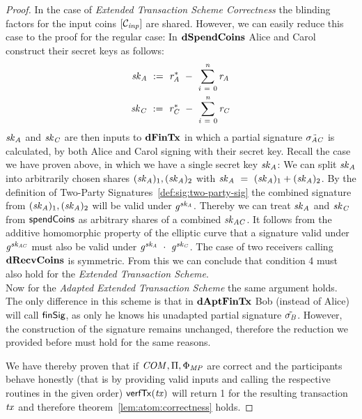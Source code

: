 \begin{proof}
    In the case of \emph{Extended Transaction Scheme Correctness} the blinding factors for the input coins $[\mathcal{C}_{\mathit{inp}}]$ are shared.
    However, we can easily reduce this case to the proof for the regular case:
    In $\mathbf{dSpendCoins}$ Alice and Carol construct their secret keys as follows:
    \begin{gather}
        \mathit{sk}_{\mathit{A}} ~:=~ \mathit{r}_{\mathit{A}}^* ~-~ \sum_{\mathit{i} ~=~ 0}^{\mathit{n}} \mathit{r}_{\mathit{A}} \\
        \mathit{sk}_{\mathit{C}} ~:=~ \mathit{r}_{\mathit{C}}^* ~-~ \sum_{\mathit{i} ~=~ 0}^{\mathit{n}} \mathit{r}_{\mathit{C}}
    \end{gather}
    $\mathit{sk}_{\mathit{A}}$ and $\mathit{sk}_{\mathit{C}}$ are then inputs to $\mathbf{dFinTx}$ in which a partial signature $\tilde{\sigma_{\mathit{A}\mathit{C}}}$ is calculated, by both Alice and Carol signing with their secret key.
    Recall the case we have proven above, in which we have a single secret key $\mathit{sk}_{\mathit{A}}$:
    We can split $\mathit{sk}_{\mathit{A}}$ into arbitrarily chosen shares $(\mathit{sk}_{\mathit{A}})_1, (\mathit{sk}_{\mathit{A}})_2$ with $\mathit{sk}_{\mathit{A}} ~=~ (\mathit{sk}_{\mathit{A}})_1 + (\mathit{sk}_{\mathit{A}})_2$.
    By the definition of Two-Party Signatures~\ref{def:sig:two-party-sig} the combined signature from $(\mathit{sk}_{\mathit{A}})_1, (\mathit{sk}_{\mathit{A}})_2$ will be valid under $\mathit{g}^{\mathit{sk}_{\mathit{A}}}$.
    Thereby we can treat $\mathit{sk}_{\mathit{A}}$ and $\mathit{sk}_{\mathit{C}}$ from $\mathsf{spendCoins}$ as arbitrary shares of a combined $\mathit{sk}_{\mathit{A}\mathit{C}}$.
    It follows from the additive homomorphic property of the elliptic curve that a signature valid under $\mathit{g}^{\mathit{sk}_{\mathit{A}\mathit{C}}}$ must also be valid under $\mathit{g}^{\mathit{sk}_{\mathit{A}}} ~\cdot~ \mathit{g}^{\mathit{sk}_{\mathit{C}}}$.
    The case of two receivers calling $\mathbf{dRecvCoins}$ is symmetric.
    From this we can conclude that condition 4 must also hold for the \emph{Extended Transaction Scheme}. \\
    Now for the \emph{Adapted Extended Transaction Scheme} the same argument holds.
    The only difference in this scheme is that in $\mathbf{dAptFinTx}$ Bob (instead of Alice) will call $\mathsf{finSig}$, as only he knows his unadapted partial signature $\tilde{\sigma_{\mathit{B}}}$.
    However, the construction of the signature remains unchanged, therefore the reduction we provided before must hold for the same reasons.

    We have thereby proven that if $\mathit{COM}, \Pi, \Phi_{\mathit{MP}}$ are correct and the participants behave honestly (that is by providing valid inputs and calling the respective routines in the given order) $\mathsf{verfTx}(\mathit{tx})$ will return 1 for the resulting transaction $\mathit{tx}$ and therefore theorem~\ref{lem:atom:correctness} holds.
\end{proof}

